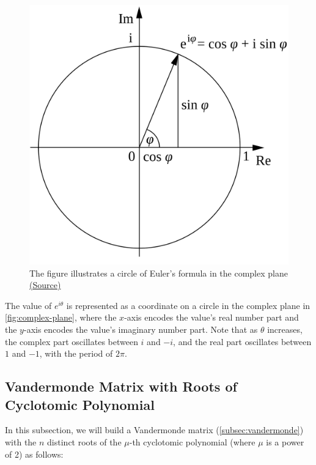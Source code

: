 \begin{figure}[!h]
    \centering
  \includegraphics[width=0.4\linewidth]{figures/euler-formula.png}
  \caption{The figure illustrates a circle of Euler's formula in the complex plane \href{https://en.wikipedia.org/wiki/Euler's_formula}{(Source)}}
  \label{fig:complex-plane}
\end{figure}

The value of $e^{i\theta}$ is represented as a coordinate on a circle in the complex plane in \autoref{fig:complex-plane}, where the $x$-axis encodes the value's real number part and the $y$-axis encodes the value's imaginary number part. Note that as $\theta$ increases, the complex part oscillates between $i$ and $-i$, and the real part oscillates between $1$ and $-1$, with the period of $2\pi$. 


\subsection{Vandermonde Matrix with Roots of Cyclotomic Polynomial}
\label{subsec:vandermonde-euler}

 
 
In this subsection, we will build a Vandermonde matrix (\autoref{subsec:vandermonde}) with the $n$ distinct roots of the $\mu$-th cyclotomic polynomial (where $\mu$ is a power of 2) as follows:



